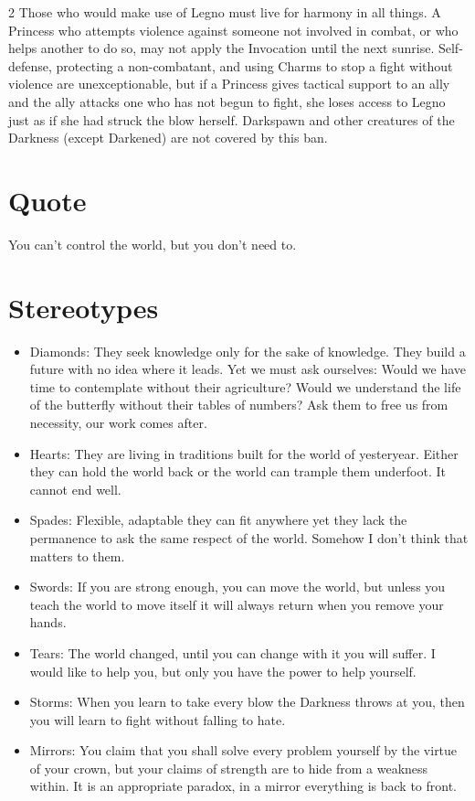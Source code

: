 \begin{multicols}{2}
Those who would make use of Legno must live for harmony in all things. A Princess who attempts violence against someone not involved in combat, or who helps another to do so, may not apply the Invocation until the next sunrise. Self-defense, protecting a non-combatant, and using Charms to stop a fight without violence are unexceptionable, but if a Princess gives tactical support to an ally and the ally attacks one who has not begun to fight, she loses access to Legno just as if she had struck the blow herself. Darkspawn and other creatures of the Darkness (except Darkened) are not covered by this ban. 

\section*{Quote}

You can't control the world, but you don't need to.

\section*{Stereotypes}

\begin{itemize}
\item Diamonds: They seek knowledge only for the sake of knowledge. They build a future with no idea where it leads. Yet we must ask ourselves: Would we have time to contemplate without their agriculture? Would we understand the life of the butterfly without their tables of numbers? Ask them to free us from necessity, our work comes after.
\item Hearts: They are living in traditions built for the world of yesteryear. Either they can hold the world back or the world can trample them underfoot. It cannot end well.
\item Spades: Flexible, adaptable they can fit anywhere yet they lack the permanence to ask the same respect of the world. Somehow I don't think that matters to them.
\item Swords: If you are strong enough, you can move the world, but unless you teach the world to move itself it will always return when you remove your hands.

\item Tears: The world changed, until you can change with it you will suffer. I would like to help you, but only you have the power to help yourself. 
\item Storms: When you learn to take every blow the Darkness throws at you, then you will learn to fight without falling to hate. 
\item Mirrors: You claim that you shall solve every problem yourself by the virtue of your crown, but your claims of strength are to hide from a weakness within. It is an appropriate paradox, in a mirror everything is back to front.       


\end{itemize}
\end{multicols}
